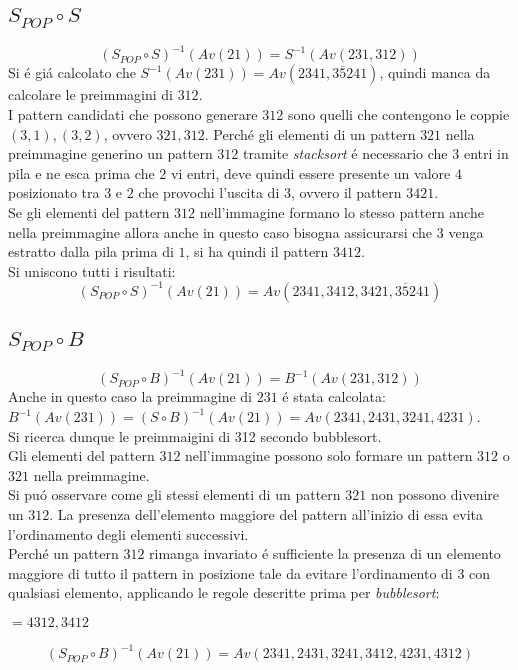 \subsection*{$S_{POP}\circ{S}$}$$(S_{POP}\circ{S})^{-1}(Av(21))=S^{-1}(Av(231,312))$$
Si \'e gi\'a calcolato che $S^{-1}(Av(231))=Av(2341, 3\overline{5}241)$, quindi manca da calcolare le preimmagini di $312$.\\
I pattern candidati che possono generare $312$ sono quelli che contengono le coppie $(3,1),(3,2)$, ovvero $321, 312$.
Perch\'e gli elementi di un pattern $321$ nella preimmagine generino un pattern $312$ tramite \textit{stacksort} \'e necessario che $3$ entri in pila e ne esca prima che $2$ vi entri, deve quindi essere presente un valore $4$ posizionato tra $3$ e $2$ che provochi l'uscita di $3$, ovvero il pattern $3421$.\\
Se gli elementi del pattern $312$ nell'immagine formano lo stesso pattern anche nella preimmagine allora anche in questo caso bisogna assicurarsi che $3$ venga estratto dalla pila prima di $1$, si ha quindi il pattern $3412$.\\Si uniscono tutti i risultati:
$$(S_{POP}\circ{S})^{-1}(Av(21))=Av(2341, 3412, 3421, 3\overline{5}241)$$
\subsection*{$S_{POP}\circ{B}$}$$(S_{POP}\circ{B})^{-1}(Av(21))=B^{-1}(Av(231,312))$$
Anche in questo caso la preimmagine di $231$ \'e stata calcolata: $B^{-1}(Av(231)) = (S\circ{B})^{-1}(Av(21)) = Av(2341, 2431, 3241, 4231)$.\\
Si ricerca dunque le preimmaigini di 312 secondo bubblesort. \\
Gli elementi del pattern $312$ nell'immagine possono solo formare un pattern $312$ o $321$ nella preimmagine.\\
Si pu\'o osservare come gli stessi elementi di un pattern $321$ non possono divenire un $312$. La presenza dell'elemento maggiore del pattern all'inizio di essa evita l'ordinamento degli elementi successivi.\\
Perch\'e un pattern $312$ rimanga invariato \'e sufficiente la presenza di un elemento maggiore di tutto il pattern in posizione tale da evitare l'ordinamento di $3$ con qualsiasi elemento, applicando le regole descritte prima per \textit{bubblesort}: 
\begin{center}
$=4312,3412$
\end{center}
$$(S_{POP}\circ{B})^{-1}(Av(21))=Av(2341, 2431, 3241, 3412, 4231, 4312)$$

